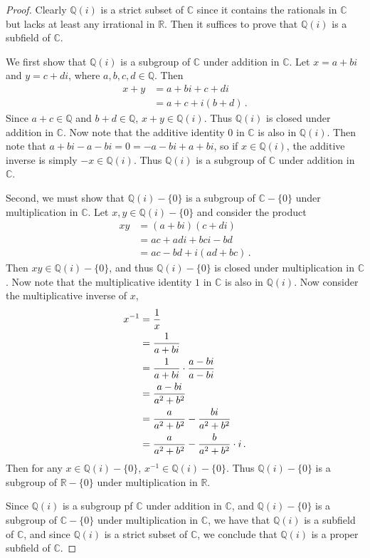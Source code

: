 \documentclass{abrice}
\newcommand{\R}{\mathbb{R}}
\newcommand{\Q}{\mathbb{Q}}
\renewcommand{\C}{\mathbb{C}}
\begin{document}
\begin{proof}
  Clearly $\Q(i)$ is a strict subset of $\C$ since it contains the rationals in
  $\C$ but lacks at least any irrational in $\R$. Then it suffices to prove that
  $\Q(i)$ is a subfield of $\C$.

  We first show that $\Q(i)$ is a subgroup of $\C$ under addition in $\C$. Let
  $x = a + bi$ and $y = c + di$, where $a,b,c,d \in \Q$. Then
  \begin{align*}
    x + y
    &= a + bi + c + di \\
    &= a + c + i(b + d)\, .
  \end{align*}
  Since $a + c \in \Q$ and $b + d \in \Q$, $x + y \in \Q(i)$. Thus $\Q(i)$ is
  closed under addition in $\C$. Now note that the additive identity $0$ in $\C$
  is also in $\Q(i)$. Then note that $a + bi - a - bi = 0 = - a - bi + a
  + bi$, so if $x \in \Q(i)$, the additive inverse is simply $-x \in \Q(i)$. Thus $\Q(i)$
  is a subgroup of $\C$ under addition in $\C$.

  Second, we must show that $\Q(i) - \{0\}$ is a subgroup of $\C - \{0\}$ under
  multiplication in $\C$. Let $x,y \in \Q(i) - \{0\}$ and consider the product
  \begin{align*}
    xy
    &= (a + bi)(c + di) \\
    &= ac + adi + bci - bd \\
    &= ac - bd + i(ad + bc)\, .
  \end{align*}
  Then $xy \in \Q(i) - \{0\}$, and thus $\Q(i) - \{0\}$ is closed under
  multiplication in $\C$. Now note that the multiplicative identity $1$ in $\C$
  is also in $\Q(i)$. Now consider the multiplicative inverse of $x$,
  \begin{align*}
    x^{-1}
    &= {1 \over x} \\
    &= {1 \over a + bi} \\
    &= {1 \over a + bi} \cdot {a - bi \over a - bi} \\
    &= {a - bi \over a^2 + b^2} \\
    &= {a \over a^2 + b^2} - {bi \over a^2 + b^2} \\
    &= {a \over a^2 + b^2} - {b \over a^2 + b^2} \cdot i\, .
  \end{align*}
  Then for any $x \in \Q(i) - \{0\}$, $x^{-1} \in \Q(i) - \{0\}$. Thus $\Q(i) -
  \{0\}$ is a subgroup of $\R - \{0\}$ under multiplication in $\R$.

  Since $\Q(i)$ is a subgroup pf $\C$ under addition in $\C$, and $\Q(i) -
  \{0\}$ is a subgroup of $\C - \{0\}$ under multiplication in $\C$, we have
  that $\Q(i)$ is a subfield of $\C$, and since $\Q(i)$ is a strict subset of
  $\C$, we conclude that $\Q(i)$ is a proper subfield of $\C$.
\end{proof}
\end{document}
